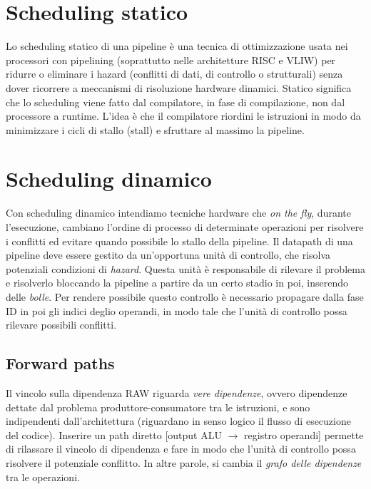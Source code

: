 \section{Scheduling statico}
Lo scheduling statico di una pipeline è una tecnica di ottimizzazione usata nei processori con pipelining (soprattutto nelle architetture RISC e VLIW) per ridurre o eliminare i hazard (conflitti di dati, di controllo o strutturali) senza dover ricorrere a meccanismi di risoluzione hardware dinamici. Statico significa che lo scheduling viene fatto dal compilatore, in fase di compilazione, non dal processore a runtime. L'idea è che il compilatore riordini le istruzioni in modo da minimizzare i cicli di stallo (stall) e sfruttare al massimo la pipeline.

\section{Scheduling dinamico}
Con scheduling dinamico intendiamo tecniche hardware che \textit{on the fly}, durante l'esecuzione, cambiano l'ordine di processo di determinate operazioni per risolvere i conflitti ed evitare quando possibile lo stallo della pipeline. 
Il datapath di una pipeline deve essere gestito da un'opportuna unità di controllo, che risolva potenziali condizioni di \textit{hazard}. Questa unità è responsabile di rilevare il problema e risolverlo bloccando la pipeline a partire da un certo stadio in poi, inserendo delle \textit{bolle}. Per rendere possibile questo controllo è necessario propagare dalla fase ID in poi gli indici deglio operandi, in modo tale che l'unità di controllo possa rilevare possibili conflitti. 

\subsection{Forward paths}
Il vincolo sulla dipendenza RAW riguarda \textit{vere dipendenze}, ovvero dipendenze dettate dal problema produttore-consumatore tra le istruzioni, e sono indipendenti dall'architettura (riguardano in senso logico il flusso di esecuzione del codice). Inserire un path diretto [output ALU $\rightarrow$ registro operandi] permette di rilassare il vincolo di dipendenza e fare in modo che l'unità di controllo possa risolvere il potenziale conflitto.  
In altre parole, si cambia il \textit{grafo delle dipendenze} tra le operazioni.

\begin{figure}[ht]
    \centering
    \setlength{\fboxrule}{0.5pt} %
    \setlength{\fboxsep}{0pt}    %
\end{figure}

